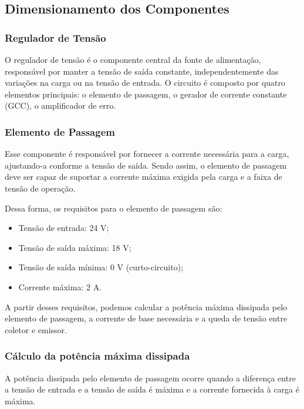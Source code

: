 \subsection{Dimensionamento dos Componentes}

\subsubsection{Regulador de Tensão}

O regulador de tensão é o componente central da fonte de alimentação, responsável por manter a tensão de saída constante, independentemente das variações na carga ou na tensão de entrada. O circuito é composto por quatro elementos principais: o elemento de passagem, o gerador de corrente constante (GCC), o amplificador de erro.

\subsubsection*{Elemento de Passagem}

Esse componente é responsável por fornecer a corrente necessária para a carga, ajustando-a conforme a tensão de saída. Sendo assim, o elemento de passagem deve ser capaz de suportar a corrente máxima exigida pela carga e a faixa de tensão de operação.

Dessa forma, os requisitos para o elemento de passagem são:

\begin{itemize}
    \item Tensão de entrada: 24 V;
    \item Tensão de saída máxima: 18 V;
    \item Tensão de saída mínima: 0 V (curto-circuito);
    \item Corrente máxima: 2 A.
\end{itemize}

A partir desses requisitos, podemos calcular a potência máxima dissipada pelo elemento de passagem, a corrente de base necessária e a queda de tensão entre coletor e emissor.

\subsubsection*{Cálculo da potência máxima dissipada}  
A potência dissipada pelo elemento de passagem ocorre quando a diferença entre a tensão de entrada e a tensão de saída é máxima e a corrente fornecida à carga é máxima.  

